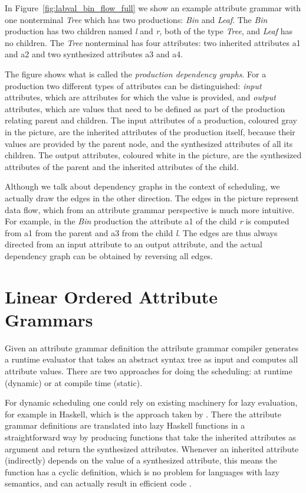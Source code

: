 \documentclass{llncs}
\newcommand{\figref}[1]{Figure~\ref{#1}}
\begin{document}
In \figref{fig:labval_bin_flow_full} we show an example attribute grammar with one nonterminal \emph{Tree} which has two productions: \emph{Bin} and \emph{Leaf}. The \emph{Bin} production has two children named \emph{l} and \emph{r}, both of the type \emph{Tree}, and \emph{Leaf} has no children. The \emph{Tree} nonterminal has four attributes: two inherited attributes a1 and a2 and two synthesized attributes a3 and a4.

The figure shows what is called the \emph{production dependency graphs}. For a production two different types of attributes can be distinguished: \emph{input} attributes, which are attributes for which the value is provided, and \emph{output} attributes, which are values that need to be defined as part of the production relating parent and children. The input attributes of a production, coloured gray in the picture, are the inherited attributes of the production itself, because their values are provided by the parent node, and the synthesized attributes of all its children. The output attributes, coloured white in the picture, are the synthesized attributes of the parent and the inherited attributes of the child.

Although we talk about dependency graphs in the context of scheduling, we actually draw the edges in the other direction. The edges in the picture represent data flow, which from an attribute grammar perspective is much more intuitive. For example, in the \emph{Bin} production the attribute a1 of the child \emph{r} is computed from a1 from the parent and a3 from the child \emph{l}. The edges are thus always directed from an input attribute to an output attribute, and the actual dependency graph can be obtained by reversing all edges.

\section{Linear Ordered Attribute Grammars} \label{sect:loag}
Given an attribute grammar definition the attribute grammar compiler generates a runtime evaluator that takes an abstract syntax tree as input and computes all attribute values. There are two approaches for doing the scheduling: at runtime (dynamic) or at compile time (static).

For dynamic scheduling one could rely on existing machinery for lazy evaluation, for example in Haskell, which is the approach taken by \cite{saraiva99}. There the attribute grammar definitions are translated into lazy Haskell functions in a straightforward way by producing functions that take the inherited attributes as argument and return the synthesized attributes. Whenever an inherited attribute (indirectly) depends on the value of a synthesized attribute, this means the function has a cyclic definition, which is no problem for languages with lazy semantics, and can actually result in efficient code \cite{Bird:1984}.
\end{document}
